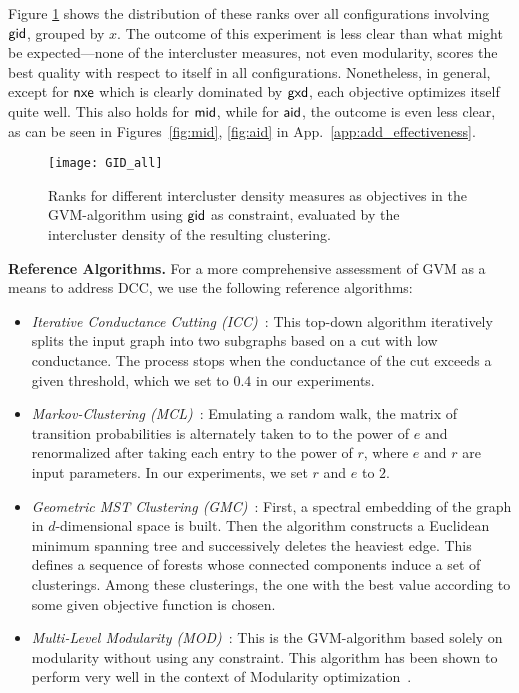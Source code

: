 \documentclass{llncs}
\newcommand{\measure}[1]{\ensuremath{\text{\normalfont{\sffamily {#1}}}}\xspace}
\newcommand{\andreapar}{\vspace*{.5ex}\par\noindent}
\begin{document}
Figure \ref{fig:gid} shows the distribution of these ranks over all configurations involving \measure{gid}, grouped by $x$. 
The outcome of this experiment is less clear than what might be expected---none of the intercluster measures, not even modularity, scores the best quality with respect to itself in all configurations.
Nonetheless, in general, except for \measure{nxe} which is clearly dominated by \measure{gxd}, each objective optimizes itself quite well.
This also holds for \measure{mid}, while for \measure{aid}, the outcome is even less clear, as can be seen in Figures~\ref{fig:mid}, \ref{fig:aid} in App.~\ref{app:add_effectiveness}.
\begin{figure}[t]
 	\centerline{\texttt{[image: GID\_all]}}
	\vspace*{-1.5ex}
 	\caption{Ranks for different intercluster density measures as objectives in the GVM-algorithm using \measure{gid} as constraint, evaluated by the intercluster density of the resulting clustering.}
 	\label{fig:gid}
\end{figure}
\andreapar\textbf{Reference Algorithms.}
For a more comprehensive assessment of GVM as a means to address \textsc{DCC}, we use the following reference algorithms:
\vspace*{-0.5ex}
\begin{itemize}
    \item \emph{Iterative Conductance Cutting (ICC)}~\cite{kvv-cgds-00}:
    This top-down algorithm iteratively splits the input graph into two subgraphs based on a cut with low conductance.
    The process stops when the conductance of the cut exceeds a given threshold, which we set to $0.4$ in our experiments.
	\item \emph{Markov-Clustering (MCL)}~\cite{phd-dongen-02}:
	Emulating a random walk, the matrix of transition probabilities is alternately taken to to the power of $e$ and renormalized after taking each entry to the power of $r$, where $e$ and $r$ are input parameters.
In our experiments, we set $r$ and $e$ to $2$.
	\item \emph{Geometric MST Clustering (GMC)}~\cite{bgw-egca-03}: First, a spectral embedding of the graph in $d$-dimensional space is built.
	Then the algorithm constructs a Euclidean minimum spanning tree and successively deletes the heaviest edge.
	This defines a sequence of forests whose connected components induce a set of clusterings.
	Among these clusterings, the one with the best value according to some given objective function is chosen.
	\item \emph{Multi-Level Modularity (MOD)}~\cite{rn-m-11}: This is the GVM-algorithm based solely on modularity without using any constraint. This algorithm has been shown to perform very well in the context of Modularity optimization~\cite{rn-m-11}.
\end{itemize}
\end{document}
